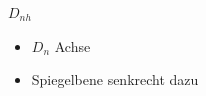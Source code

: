 \begin{frame}[t]
\begin{columns}[t,onlytextwidth]
\begin{column}{0.33\textwidth}
\begin{block}{$D_{nh}$}
\begin{center}
\end{center}
\begin{itemize}
\item $D_n$ Achse
\item Spiegelbene senkrecht dazu
\end{itemize}
\end{block}
\end{column}
\end{columns}
\end{frame}
\egroup
